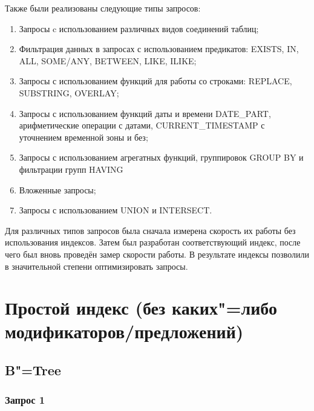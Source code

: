 \documentclass[otchet]{SCWorks}
\begin{document}
Также были реализованы следующие типы запросов:
\begin{enumerate}
\item Запросы c использованием различных видов соединений таблиц;
\item Фильтрация данных в запросах с использованием предикатов: EXISTS, IN, ALL, SOME/ANY, BETWEEN, LIKE, ILIKE;
\item Запросы с использованием функций для работы со строками: REPLACE, SUBSTRING, OVERLAY;
\item Запросы с использованием функций даты и времени DATE\_PART, арифметические операции с датами, CURRENT\_TIMESTAMP с уточнением временной зоны и без;
\item Запросы с использованием агрегатных функций, группировок GROUP BY и фильтрации групп HAVING
\item Вложенные запросы;
\item Запросы с использованием UNION и INTERSECT.
\end{enumerate}

Для различных типов запросов была сначала измерена скорость их работы без использования индексов. Затем был разработан соответствующий индекс, после чего был вновь проведён замер скорости работы. В результате индексы позволили в значительной степени оптимизировать запросы.


\section{Простой индекс (без каких"=либо модификаторов/предложений)}

\subsection{B"=Tree}

\subsubsection{Запрос 1}
\end{document}
